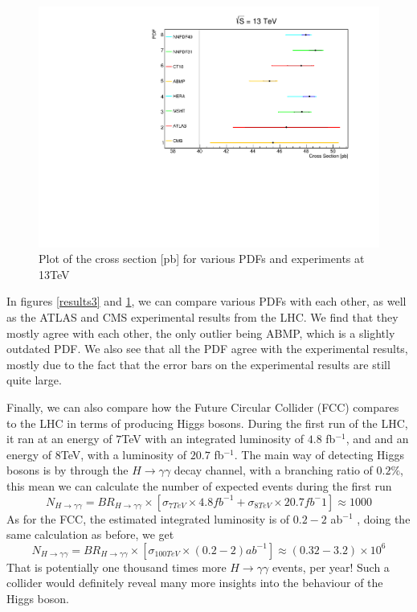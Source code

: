 \documentclass[EPJ,twocolumn]{webofc}
\begin{document}
\begin{figure}[H]
    \centering
    \includegraphics[width=.8\columnwidth]{Images/Graph3.pdf}
    \caption{Plot of the cross section [pb] for various PDFs and experiments at 13TeV }
    \label{results4}
\end{figure}

In figures \ref{results3} and \ref{results4}, we can compare various PDFs with each other, as well as the ATLAS and CMS experimental results from the LHC. We find that they mostly agree with each other, the only outlier being  ABMP, which is a slightly outdated PDF. We also see that all the PDF agree with the experimental results, mostly due to the fact that the error bars on the experimental results are still quite large.

Finally, we can also compare how the Future Circular Collider (FCC) compares to the LHC in terms of producing Higgs bosons. During the first run of the LHC, it ran at an energy of $7$TeV with an integrated luminosity of $4.8$ fb$^{-1}$, and and an energy of $8$TeV, with a luminosity of $20.7$ fb$^{-1}$. The main way of detecting Higgs bosons is by through the $H\rightarrow\gamma\gamma$ decay channel, with a branching ratio of $0.2\%$, this mean we can calculate the number of expected events during the first run
\small
\begin{equation*}
         N_{H\rightarrow\gamma\gamma} = BR_{H\rightarrow\gamma\gamma} \times\left[\sigma_{7TeV} \times 4.8fb^{-1} + \sigma_{8TeV} \times 20.7fb^-1\right] \approx 1000   
\end{equation*}
\normalsize
As for the FCC, the estimated integrated luminosity is of $0.2-2$ ab$^{-1}$ \cite{Zimmermann:IPAC2016-TUPMW037}, doing the same calculation as before, we get
\small
\begin{equation*}
         N_{H\rightarrow\gamma\gamma} = BR_{H\rightarrow\gamma\gamma} \times\left[\sigma_{100TeV} \times (0.2-2)ab^{-1}\right] \approx (0.32-3.2) \times 10^6
     \end{equation*}
\normalsize
     That is potentially one thousand times more $H\rightarrow\gamma\gamma$ events, per year! Such a collider would definitely reveal many more insights into the behaviour of the Higgs boson.
\end{document}
